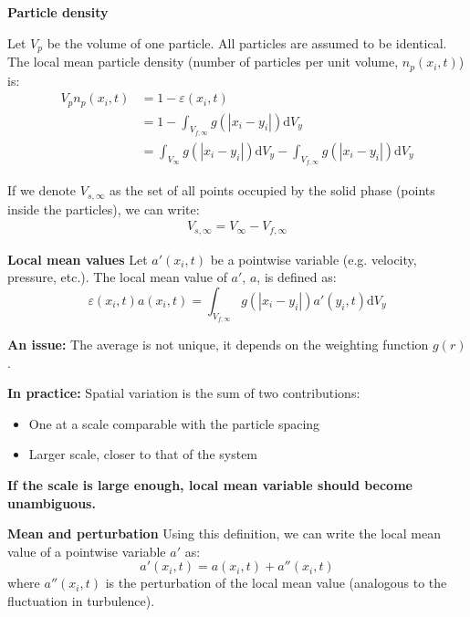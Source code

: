 \documentclass[c,11pt,xcolor=dvipsnames, aspectratio=169]{beamer}
\begin{document}
\begin{frame}{\textbf{Particle density}}

Let $V_p$ be the volume of one particle. All particles are assumed to be identical. The local mean particle density (number of particles per unit volume, $n_p(x_i,t)$) is:
\begin{align*}
V_p n_p(x_i,t) &= 1 - \varepsilon(x_i,t) \\
               &= 1 - \int_{V_{f,\infty}} g(|x_i-y_i|) \mathrm{d}V_y \\
							 &= \int_{V_{\infty}} g(|x_i-y_i|) \mathrm{d}V_y - \int_{V_{f,\infty}} g(|x_i-y_i|) \mathrm{d}V_y 
\end{align*}

If we denote $V_{s,\infty}$ as the set of all points occupied by the solid phase (points inside the particles), we can write:
\begin{align*}
V_{s,\infty} = V_\infty  - V_{f,\infty}
\end{align*}
\end{frame}


\begin{frame}{\textbf{Local mean values}}
Let $a'(x_i,t)$ be a pointwise variable (e.g. velocity, pressure, etc.). The local mean value of $a'$, $a$, is defined as:
\[
\varepsilon(x_i,t) a(x_i,t) = \int_{V_{f,\infty}} g(|x_i-y_i|) a'(y_i,t) \mathrm{d}V_y
\]

{
\textbf{An issue: }The average is not unique, it depends on the weighting function $g(r)$.
}

{
\textbf{In practice: } Spatial variation is the sum of two contributions:
\begin{itemize}
	\item One at a scale comparable with the particle spacing
	\item Larger scale, closer to that of the system
\end{itemize}
}
{
	\textbf{If the scale is large enough, local mean variable should become unambiguous.}
}
\end{frame}

\begin{frame}{\textbf{Mean and perturbation}}
Using this definition, we can write the local mean value of a pointwise variable $a'$ as:
\[
a'(x_i,t) = a(x_i,t) + a''(x_i,t)
\]
where $a''(x_i,t)$ is the perturbation of the local mean value (analogous to the fluctuation in turbulence).
\end{frame}
\end{document}
